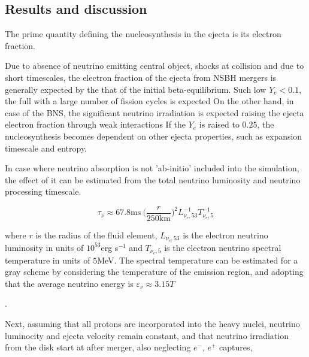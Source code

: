 \subsection{Results and discussion}

The prime quantity defining the nucleosynthesis in the ejecta is its electron fraction. 

Due to absence of neutrino emitting central object, shocks at collision and due to short timescales, the electron fraction of the ejecta from \ac{NSBH} mergers is generally expected by the that of the initial beta-equilibrium.
Such low  $Y_e < 0.1$, the full \rproc{} with a large number of fission cycles is expected
On the other hand, in case of the \ac{BNS}, the significant neutrino irradiation is expected raising the ejecta electron fraction through weak interactions
If the $Y_e$ is raised to $0.25$, the nucleosynthesis becomes dependent on other ejecta properties, such as expansion timescale and entropy. 

In case where neutrino absorption is not 'ab-initio' included into the simulation, the effect of it can be estimated from the total neutrino luminosity and neutrino processing timescale. 

\begin{equation}
\tau_{\nu} \approx 67.8 \text{ms} \: \Big(\frac{r}{250\text{km}}\Big)^2 L_{\nu_e, 53}^{-1} T_{\nu_e, 5}^{-1}
\end{equation}

where $r$ is the radius of the fluid element, $L_{\nu_e, 53}$ is the electron neutrino luminosity in units of $10^{53}$erg s$^{-1}$ and $T_{\nu_e,5}$ is the electron neutrino spectral temperature in units of $5$MeV. The spectral temperature can be estimated for a gray scheme by considering the temperature of the emission region, and adopting that the average neutrino energy is $\varepsilon_{\nu} \approx 3.15T$ 

 .

Next, assuming that all protons are incorporated into the heavy nuclei, neutrino luminocity and ejecta velocity remain constant, and that neutrino irradiation from the disk start at after merger, also neglecting $e^{-}$, $e^{+}$ captures, 

